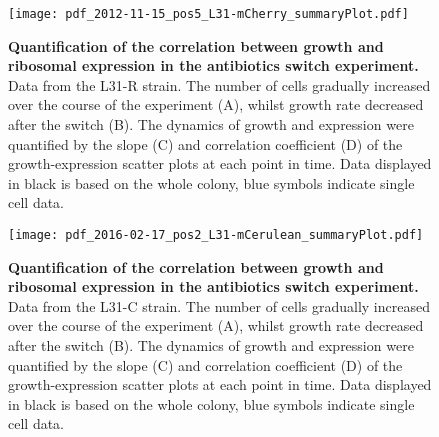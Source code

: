 \begin{figure}
    \begin{minipage}[c]{0.7\textwidth}
    \texttt{[image: pdf\_2012-11-15\_pos5\_L31-mCherry\_summaryPlot.pdf]}
    \end{minipage}\hfill
    \begin{minipage}[c]{0.3\textwidth}
    \caption{ 
        \textbf{Quantification of the correlation between growth and ribosomal expression in the antibiotics switch experiment.}
        Data from the L31-R strain. The number of cells gradually increased over the course of the experiment (A), whilst growth rate decreased after the switch (B).
        The dynamics of growth and expression were quantified by the slope (C) and correlation coefficient (D) of the growth-expression scatter plots at each point in time.
        Data displayed in black is based on the whole colony, blue symbols indicate single cell data.
    }
    \label{fig:ribo:switch1}
    \end{minipage}
\end{figure}

\begin{figure}
    \begin{minipage}[c]{0.7\textwidth}
        \texttt{[image: pdf\_2016-02-17\_pos2\_L31-mCerulean\_summaryPlot.pdf]}
    \end{minipage}\hfill
    \begin{minipage}[c]{0.3\textwidth}
        \caption{ 
            \textbf{Quantification of the correlation between growth and ribosomal expression in the antibiotics switch experiment.}
            Data from the L31-C strain. The number of cells gradually increased over the course of the experiment (A), whilst growth rate decreased after the switch (B).
            The dynamics of growth and expression were quantified by the slope (C) and correlation coefficient (D) of the growth-expression scatter plots at each point in time.
            Data displayed in black is based on the whole colony, blue symbols indicate single cell data.
        }
        \label{fig:ribo:switch2}
    \end{minipage}
\end{figure}


